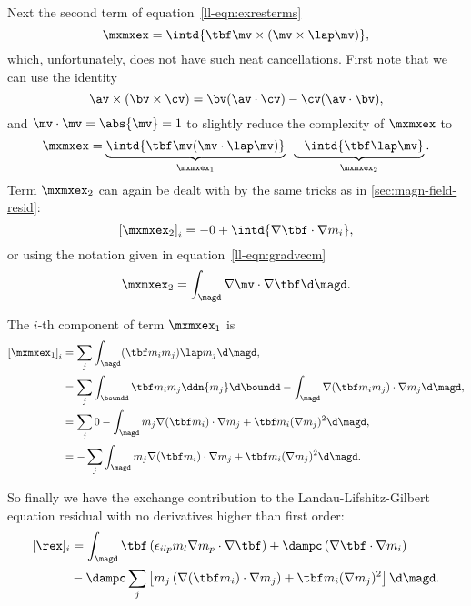 Next the second term of equation~\eqref{ll-eqn:exresterms}
\begin{equation}
  \mxmxex = \intd{\tbf \mv \times \left( \mv \times \lap \mv \right)},
\end{equation}
which, unfortunately, does not have such neat cancellations.
First note that we can use the identity
\begin{equation}
  \av \times ( \bv \times \cv ) = \bv ( \av \cdot \cv) - \cv ( \av \cdot \bv),
  \label{ll-eqn:double-cross-id}
\end{equation}
and $\mv \cdot \mv = \abs{\mv} = 1$ to slightly reduce the complexity of $\mxmxex$ to
\begin{equation}
  \mxmxex = \underbrace{\intd{\tbf \mv (\mv \cdot \lap \mv)}}_{\mxmxex_1} \;\;
  \underbrace{- \intd{\tbf \lap \mv}}_{\mxmxex_2}.
\end{equation}
Term $\mxmxex_2$ can again be dealt with by the same tricks as in \cref{sec:magn-field-resid}:
\begin{equation}
  \left[ \mxmxex_2 \right]_i = -0 + \intd{\nabla \tbf \cdot \nabla m_i},
\end{equation}
or using the notation given in equation~\eqref{ll-eqn:gradvecm}
\begin{equation}
  \mxmxex_2 = \int_\magd \nabla \mv \cdot \nabla \tbf  \d\magd.
\end{equation}

The $i$-th component of term $\mxmxex_1$ is
\begin{equation}
\begin{aligned}
  \left[\mxmxex_1\right]_i &= \sum_j \int_\magd (\tbf m_i  m_j) \lap m_j \d\magd, \\
  &= \sum_j \int_\boundd \tbf  m_i  m_j \ddn{m_j} \d\boundd
  - \int_\magd  \nabla(\tbf m_i  m_j) \cdot \nabla m_j  \d\magd, \\
  &= \sum_j 0 - \int_\magd m_j \nabla(\tbf m_i) \cdot \nabla m_j
  + \tbf m_i (\nabla m_j)^2 \d\magd, \\
  &= - \sum_j \int_\magd m_j \nabla(\tbf m_i) \cdot \nabla m_j
  + \tbf m_i (\nabla m_j)^2 \d\magd.
\end{aligned}
\end{equation}

So finally we have the exchange contribution to the Landau-Lifshitz-Gilbert equation residual with no derivatives higher than first order:
\begin{equation}
\begin{aligned}
  [\rex]_i &= \int_\magd \tbf\left(  \epsilon_{ilp} m_l\nabla m_p \cdot \nabla \tbf \right)
  + \dampc \left(\nabla \tbf \cdot \nabla m_i \right)\\
  &- \dampc \sum_j \left[ m_j
    \left(\nabla(\tbf m_i) \cdot \nabla m_j \right)
    + \tbf m_i (\nabla m_j)^2 \right] \d\magd.
\end{aligned}
\end{equation}



